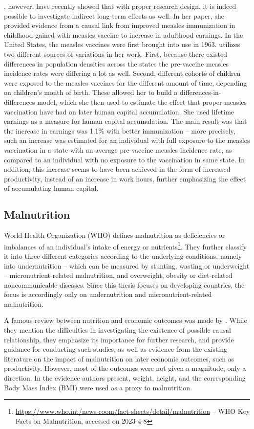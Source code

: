 \documentclass[12pt,a4paper,notitlepage]{article}
\begin{document}
\citet{Atwood:2022}, however, have recently showed that with proper research design, it is indeed possible to investigate indirect long-term effects as well. In her paper, she provided evidence from a causal link from improved measles immunization in childhood gained with measles vaccine to increase in adulthood earnings. In the United States, the measles vaccines were first brought into use in 1963. \cite{Atwood:2022} utilizes two different sources of variations in her work. First, because there existed differences in population densities across the states the pre-vaccine measles incidence rates were differing a lot as well. Second, different cohorts of children were exposed to the measles vaccines for the different amount of time, depending on children's month of birth. These allowed her to build a differences-in-differences-model, which she then used to estimate the effect that proper measles vaccination have had on later human capital accumulation. She used lifetime earnings as a measure for human capital accumulation. The main result was that the increase in earnings was 1.1\% with better immunization -- more precisely, such an increase was estimated for an individual with full exposure to the measles vaccination in a state with an average pre-vaccine measles incidence rate, as compared to an individual with no exposure to the vaccination in same state. In addition, this increase seems to have been achieved in the form of increased productivity, instead of an increase in work hours, further emphasizing the effect of accumulating human capital.

\subsection{Malnutrition}

World Health Organization (WHO) defines malnutrition as deficiencies or imbalances of an individual's intake of energy or nutrients\footnote{\url{https://www.who.int/news-room/fact-sheets/detail/malnutrition} -- WHO Key Facts on Malnutrition, accessed on 2023-4-8}. They further classify it into three different categories according to the underlying conditions, namely into undernutrition -- which can be measured by stunting, wasting or underweight -- micronutrient-related malnutrition, and overweight, obesity or diet-related noncommunicable diseases. Since this thesis focuses on developing countries, the focus is accordingly only on undernutrition and micronutrient-related malnutrition.

A famous review between nutrition and economic outcomes was made by \citet{Strauss:1998}. While they mention the difficulties in investigating the existence of possible causal relationship, they emphasize its importance for further research, and provide guidance for conducting such studies, as well as evidence from the existing literature on the impact of malnutrition on later economic outcomes, such as productivity. However, most of the outcomes were not given a magnitude, only a direction. In the evidence authors present, weight, height, and the corresponding Body Mass Index (BMI) were used as a proxy to malnutrition.
\end{document}
